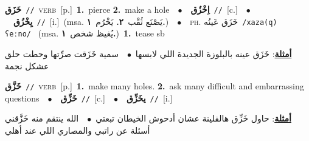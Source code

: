 \documentclass[10pt,a4paper,twoside]{article} %
\begin{document}
\begin{multicols}{2}
{\setlength\topsep{0pt}\textbf{\foreignlanguage{arabic}{خَزَق}}\ {\color{gray}\texttt{//}\color{black}}\ \textsc{verb}\ [p.]\ \textbf{1.}~pierce  \textbf{2.}~make a hole\ \ $\bullet$\ \ \setlength\topsep{0pt}\textbf{\foreignlanguage{arabic}{اِخْزُق}}\ {\color{gray}\texttt{//}\color{black}}\ [c.]\ \ $\bullet$\ \ \setlength\topsep{0pt}\textbf{\foreignlanguage{arabic}{يِخْزُق}}\ {\color{gray}\texttt{//}\color{black}}\ [i.]\ \color{gray}(msa. \foreignlanguage{arabic}{يَصْنَع ثُقْب}~\foreignlanguage{arabic}{\textbf{٢.}}  \foreignlanguage{arabic}{يَخْرُم}~\foreignlanguage{arabic}{\textbf{١.}})\color{black}\ \ $\bullet$\ \ \textsc{ph.} \color{gray} \foreignlanguage{arabic}{خَزَق عَينُه}\color{black}\ {\color{gray}\texttt{/{\sffamily xaza(q) ʕeːno}/}\color{black}}\ \color{gray} (msa. \foreignlanguage{arabic}{يُغيظ شخص}~\foreignlanguage{arabic}{\textbf{١.}})\color{black}\ \textbf{1.}~tease sb\  \begin{flushright}\color{gray}\foreignlanguage{arabic}{\textbf{\underline{\foreignlanguage{arabic}{أمثلة}}}: خَزَق عينه بالبلوزة الجديدة اللي لابسها\ $\bullet$\ \  سمية خَزَقت صرِّتها وحطت حلق عشكل نجمة}\end{flushright}\color{black}} \vspace{2mm}

{\setlength\topsep{0pt}\textbf{\foreignlanguage{arabic}{خَزَّق}}\ {\color{gray}\texttt{//}\color{black}}\ \textsc{verb}\ [p.]\ \textbf{1.}~make many holes.  \textbf{2.}~ask many difficult and embarrassing questions\ \ $\bullet$\ \ \setlength\topsep{0pt}\textbf{\foreignlanguage{arabic}{خَزِّق}}\ {\color{gray}\texttt{//}\color{black}}\ [c.]\ \ $\bullet$\ \ \setlength\topsep{0pt}\textbf{\foreignlanguage{arabic}{يخَزِّق}}\ {\color{gray}\texttt{//}\color{black}}\ [i.]\  \begin{flushright}\color{gray}\foreignlanguage{arabic}{\textbf{\underline{\foreignlanguage{arabic}{أمثلة}}}: حاول خَزِّق هالفلينة عشان أدحوش الخيطان تبعتي\ $\bullet$\ \  الله ينتقم منه خَزَّقني أسئلة عن راتبي والمصاري اللي عند أهلي}\end{flushright}\color{black}} \vspace{2mm}


\end{multicols}
\end{document}
